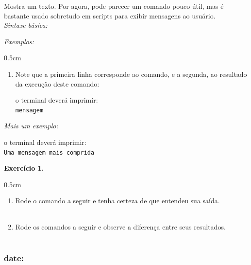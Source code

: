 \begin{refsection}
Mostra um texto. Por agora, pode parecer um comando pouco útil, mas é bastante usado sobretudo em scripts para exibir mensagens ao usuário.\\

\textit{Sintaxe básica:}


\textit{Exemplos:}
\begin {myindentpar}{0.5cm}
\begin{enumerate}[\itshape i.]

 \item{Note que a primeira linha corresponde ao comando, e a segunda, ao resultado da execução deste comando:}


o terminal deverá imprimir:\\
\indent\indent\texttt{mensagem}

\end{enumerate}
\end{myindentpar}


\textit{Mais um exemplo:}



o terminal deverá imprimir:\\
\indent\indent\texttt{Uma mensagem mais comprida}
\\

\begin{blackBlock}{\textbf{Exercício 1.}}\label{tut1:ex:1.\arabic{ex}}

\begin {myindentpar}{0.5cm}
\begin{enumerate}[\itshape i.]
 \item{Rode o comando a seguir e tenha certeza de que entendeu sua saída.}
\\
 \\
 \item{Rode os comandos a seguir e observe a diferença entre seus resultados.}
\\
 \\

\end{enumerate}
\end{myindentpar}


\end{blackBlock}

\subsubsection{date:}\label{tut1:text_mode:commands:date}


\end{refsection}
